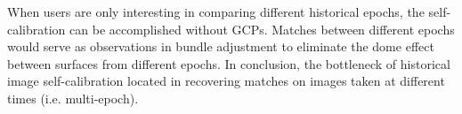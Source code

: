 When users are only interesting in comparing different historical epochs, the self-calibration can be accomplished without \ac{GCP}s. Matches between different epochs would serve as observations in bundle adjustment to eliminate the dome effect between surfaces from different epochs. In conclusion, the bottleneck of historical image self-calibration located in recovering matches on images taken at different times (i.e. multi-epoch).


